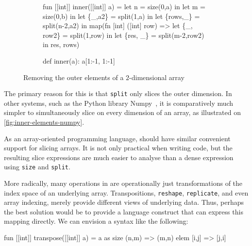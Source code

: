 \begin{figure}
\centering
\begin{subfigure}[t]{.5\textwidth}
\begin{colorcode}
fun [[int]] inner([[int]] a) =
  let n = size(0,a) in
  let m = size(0,b) in
  let \{_,a2\}   = split(1,a) in
  let \{rows,_\} = split(n-2,a2) in
  map(fn [int] ([int] row) =>
        let \{_, row2\} =
          split(1,row) in
        let \{res, _\}  =
          split(m-2,row2) in
        res,
      rows)
\end{colorcode}
\subcaption{\LO{} \label{fig:inner-elements-l0}}
\end{subfigure}\hfill
\begin{subfigure}[t]{.4\textwidth}
\begin{colorcode}
def inner(a):
  a[1:-1, 1:-1]










\end{colorcode}
\end{subfigure}
\caption{Removing the outer elements of a $2$-dimensional array}
\label{fig:inner-elements}
\end{figure}

The primary reason for this is that \texttt{split} only slices the
outer dimension.  In other systems, such as the Python library
Numpy~\cite{oliphant2006guide}, it is comparatively much simpler to
simultaneously slice on every dimension of an array, as illustrated on
\cref{fig:inner-elements-numpy}.

As an array-oriented programming language, \LO{} should have similar
convenient support for slicing arrays.  It is not only practical when
writing code, but the resulting slice expressions are much easier to
analyse than a dense expression using \texttt{size} and
\texttt{split}.

More radically, many operations in \LO{} are operationally just
transformations of the index space of an underlying array.
Transpositions, \texttt{reshape}, \texttt{replicate}, and even array
indexing, merely provide different views of underlying data.  Thus,
perhaps the best solution would be to provide a language construct
that can express this mapping directly.  We can envision a syntax like
the following:

\begin{colorcode}
fun [[int]] transpose([[int]] a) =
   a as
    size (n,m) => (m,n) 
    elem [i,j] => [j,i] 
\end{colorcode}


